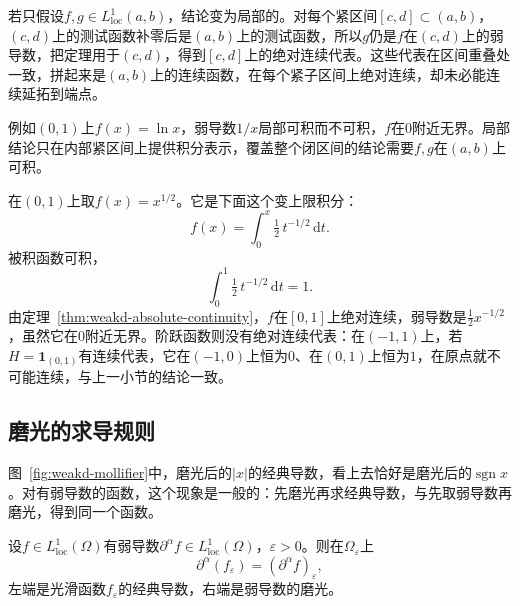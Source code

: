 若只假设$f,g\in L^1_{\mathrm{loc}}(a,b)$，结论变为局部的。对每个紧区间$[c,d]\subset(a,b)$，$(c,d)$上的测试函数补零后是$(a,b)$上的测试函数，所以$g$仍是$f$在$(c,d)$上的弱导数，把定理用于$(c,d)$，得到$[c,d]$上的绝对连续代表。这些代表在区间重叠处一致，拼起来是$(a,b)$上的连续函数，在每个紧子区间上绝对连续，却未必能连续延拓到端点。

例如$(0,1)$上$f(x)=\ln x$，弱导数$1/x$局部可积而不可积，$f$在$0$附近无界。局部结论只在内部紧区间上提供积分表示，覆盖整个闭区间的结论需要$f,g$在$(a,b)$上可积。

\begin{example}[有弱导数的无界导数]
\label{ex:weakd-power}
在$(0,1)$上取$f(x)=x^{1/2}$。它是下面这个变上限积分：
\[
f(x)=\int_0^x\tfrac12\,t^{-1/2}\,\mathrm dt .
\]
被积函数可积，
\[
\int_0^1\tfrac12\,t^{-1/2}\,\mathrm dt=1 .
\]
由定理~\ref{thm:weakd-absolute-continuity}，$f$在$[0,1]$上绝对连续，弱导数是$\tfrac12x^{-1/2}$，虽然它在$0$附近无界。阶跃函数则没有绝对连续代表：在$(-1,1)$上，若$H=\mathbf 1_{(0,1)}$有连续代表，它在$(-1,0)$上恒为$0$、在$(0,1)$上恒为$1$，在原点就不可能连续，与上一小节的结论一致。
\end{example}

\subsection{磨光的求导规则}
\label{sec:weakd-mollification-derivative}

图~\ref{fig:weakd-mollifier}中，磨光后的$\lvert x\rvert$的经典导数，看上去恰好是磨光后的$\operatorname{sgn}x$。对有弱导数的函数，这个现象是一般的：先磨光再求经典导数，与先取弱导数再磨光，得到同一个函数。

\begin{theorem}[磨光与弱导数交换]
\label{thm:weakd-mollification-commute}
设$f\in L^1_{\mathrm{loc}}(\Omega)$有弱导数$\partial^\alpha f\in L^1_{\mathrm{loc}}(\Omega)$，$\varepsilon>0$。则在$\Omega_\varepsilon$上
\begin{equation}
\partial^\alpha(f_\varepsilon)=(\partial^\alpha f)_\varepsilon ,
\label{eq:weakd-mollification-commute}
\end{equation}
左端是光滑函数$f_\varepsilon$的经典导数，右端是弱导数的磨光。
\end{theorem}

